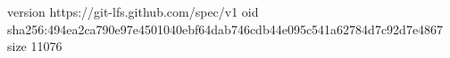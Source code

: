 version https://git-lfs.github.com/spec/v1
oid sha256:494ea2ca790e97e4501040ebf64dab746cdb44e095c541a62784d7c92d7e4867
size 11076
